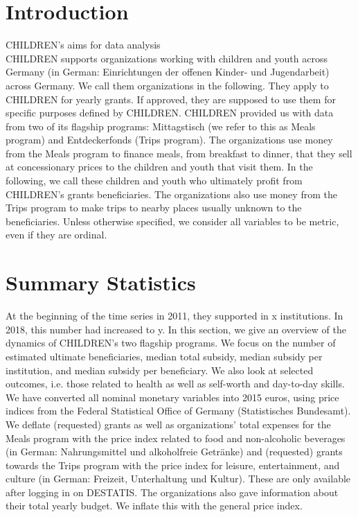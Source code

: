 \documentclass[12pt, a4paper]{article}\usepackage[]{graphicx}\usepackage[]{color}
\begin{document}
\section{Introduction}

CHILDREN's aims for data analysis\\ 
CHILDREN supports organizations working with children and youth across Germany (in German: Einrichtungen der offenen Kinder- und Jugendarbeit) across Germany. We call them organizations in the following. They apply to CHILDREN for yearly grants. If approved, they are supposed to use them for specific purposes defined by CHILDREN. CHILDREN provided us with data from two of its flagship programs: Mittagstisch (we refer to this as Meals program) and Entdeckerfonds (Trips program). The organizations use money from the Meals program to finance meals, from breakfast to dinner, that they sell at concessionary prices to the children and youth that visit them. In the following, we call these children and youth who ultimately profit from CHILDREN's grants beneficiaries. The organizations also use money from the Trips program to make trips to nearby places usually unknown to the beneficiaries.  
Unless otherwise specified, we consider all variables to be metric, even if they are ordinal. 

\section{Summary Statistics}

At the beginning of the time series in 2011, they supported in x institutions. In 2018, this number had increased to y. In this section, we give an overview of the dynamics of CHILDREN's two flagship programs. We focus on the number of estimated ultimate beneficiaries, median total subsidy, median subsidy per institution, and median subsidy per beneficiary. We also look at selected outcomes, i.e. those related to health as well as self-worth and day-to-day skills. We have converted all nominal monetary variables into 2015 euros, using price indices from the Federal Statistical Office of Germany (Statistisches Bundesamt). We deflate (requested) grants as well as organizations' total expenses for the Meals program  with the price index related to food and non-alcoholic beverages (in German: Nahrungsmittel und alkoholfreie Getränke) and (requested) grants towards the Trips program with the price index for leisure, entertainment, and culture (in German: Freizeit, Unterhaltung und Kultur). These are only available after logging in on DESTATIS. The organizations also gave information about their total yearly budget. We inflate this with the general price index.    
\end{document}
